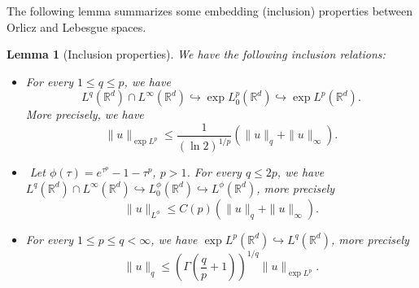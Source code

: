 \documentclass[a4paper,11pt]{amsart}
\numberwithin{equation}{section}
\theoremstyle{plain}
\newtheorem{lem}[theorem]{Lemma}
\theoremstyle{definition}
\begin{document}
The following lemma summarizes some embedding (inclusion) properties between Orlicz and Lebesgue spaces.
\begin{lem}[Inclusion properties]\label{lemma1} We have the following inclusion relations:

\begin{itemize}
\item[({1})] 
\cite[Lemma 2.3]{Majdoub2}
For every $1\leq q\leq p$, we have $$L^q(\mathbb{R}^d)\cap L^\infty(\mathbb{R}^d)\hookrightarrow \exp L^p_0(\mathbb{R}^d)\hookrightarrow \exp L^p(\mathbb{R}^d).$$ More precisely, we have 
\begin{equation}\label{eq6}
\|u\|_{\exp L^p}\leq\frac{1}{(\ln 2)^{1/p}}(\|u\|_q+\|u\|_\infty).
\end{equation}
\item[({2})] \cite[Lemma 2.3]{FK20}${}$
Let $\phi(\tau)=e^{\tau^p}-1-\tau^p$, $p>1$. For every $ q\leq 2p$, we have $L^q(\mathbb{R}^d)\cap L^\infty(\mathbb{R}^d)\hookrightarrow L^\phi_0(\mathbb{R}^d)\hookrightarrow L^\phi(\mathbb{R}^d)$, more precisely
$$
\|u\|_{ L^\phi}\leq C(p)(\|u\|_q+\|u\|_\infty).
$$
\item[({3})] \cite[Lemma 2.4]{Majdoub2}
For every $1\leq p\leq q<\infty$, we have $\exp L^p(\mathbb{R}^d)\hookrightarrow L^q(\mathbb{R}^d)$, more precisely
\begin{equation}\label{eq8}
\|u\|_q\leq\left(\Gamma\left(\frac{q}{p}+1\right)\right)^{1/q} \|u\|_{\exp L^p}.
\end{equation}
\end{itemize}
\end{lem}
\end{document}
